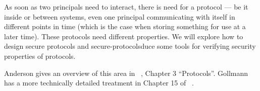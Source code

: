 As soon as two principals need to interact, there is need for a protocol --- be 
it inside or between systems, even one principal communicating with itself in 
different points in time (which is the case when storing something for use at a 
later time).
These protocols need different properties.
We will explore how to design secure protocols and secure-protocolsduce some tools for 
verifying security properties of protocols.

Anderson gives an overview of this area in 
~\cite{Anderson2008sea}, Chapter 
3 \enquote{Protocols}.
Gollmann has a more technically detailed treatment in Chapter 15 of 
~\cite{Gollmann2011cs}.

